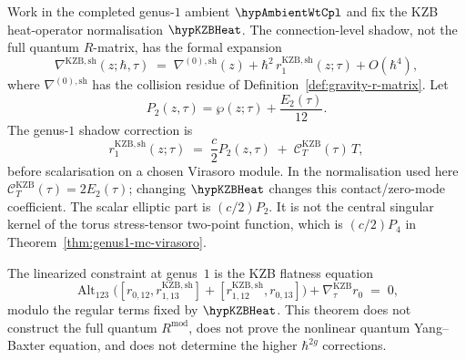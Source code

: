 \begin{theorem}
\label{thm:genus1-r-matrix}
Work in the completed genus-$1$ ambient \(\hypAmbientWtCpl\) and fix
the KZB heat-operator normalisation \(\hypKZBHeat\).  The
connection-level shadow, not the full quantum \(R\)-matrix, has the
formal expansion
\begin{equation}\label{eq:modular-r-expansion}
\nabla^{\mathrm{KZB},\mathrm{sh}}(z;\hbar,\tau)
\;=\;
\nabla^{(0),\mathrm{sh}}(z)
 + \hbar^2\, r^{\mathrm{KZB},\mathrm{sh}}_1(z;\tau)
 + O(\hbar^4),
\end{equation}
where \(\nabla^{(0),\mathrm{sh}}\) has the collision residue of
Definition~\ref{def:gravity-r-matrix}.  Let
\[
P_2(z,\tau)=\wp(z;\tau)+\frac{E_2(\tau)}{12}.
\]
The genus-$1$ shadow correction is
\begin{equation}\label{eq:genus1-r-matrix-virasoro}
r^{\mathrm{KZB},\mathrm{sh}}_1(z;\tau)
\;=\;
\frac{c}{2}P_2(z,\tau)
\;+\;
\mathcal C_T^{\mathrm{KZB}}(\tau)\,T,
\end{equation}
before scalarisation on a chosen Virasoro module.  In the normalisation
used here \(\mathcal C_T^{\mathrm{KZB}}(\tau)=2E_2(\tau)\); changing
\(\hypKZBHeat\) changes this contact/zero-mode coefficient.  The scalar
elliptic part is \((c/2)P_2\).  It is not the central singular kernel
of the torus stress-tensor two-point function, which is
\((c/2)P_4\) in Theorem~\ref{thm:genus1-mc-virasoro}.

The linearized constraint at genus~$1$ is the KZB flatness equation
\begin{equation}\label{eq:genus1-ybe}
\operatorname{Alt}_{123}
\bigl([r_{0,12},r^{\mathrm{KZB},\mathrm{sh}}_{1,13}]
      +[r^{\mathrm{KZB},\mathrm{sh}}_{1,12},r_{0,13}]\bigr)
+\nabla^{\mathrm{KZB}}_\tau r_0
\;=\;
0,
\end{equation}
modulo the regular terms fixed by \(\hypKZBHeat\).  This theorem does
not construct the full quantum \(R^{\mathrm{mod}}\), does not prove the
nonlinear quantum Yang--Baxter equation, and does not determine the
higher \(\hbar^{2g}\) corrections.
\end{theorem}

